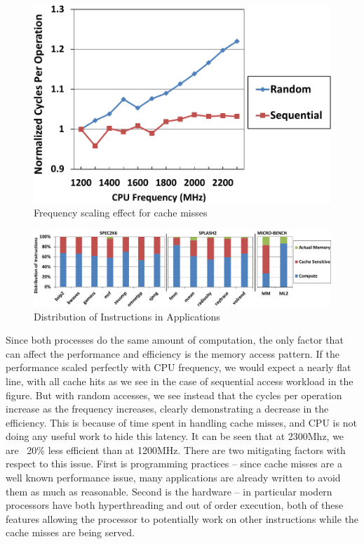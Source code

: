 \begin{figure}
  \begin{center}
\includegraphics[width=\linewidth]{figs/case-crop.pdf}
  \end{center}
  \vspace{-0.1in}
  \caption{Frequency scaling effect for cache misses}
	\label{fig:case}
\end{figure}

\begin{figure}[h]
  \begin{center}
\includegraphics[width=\linewidth]{figs/app-cat-crop.pdf}
  \end{center}
  \vspace{-0.1in}
  \caption{Distribution of Instructions in Applications}
  \label{fig:app-cat}
\end{figure}



Since both processes do the same amount of computation, the only factor that can affect the performance and efficiency is the memory access pattern. 
If the performance scaled perfectly with CPU frequency, we would expect a nearly flat line, with all cache hits
as we see in the case of sequential access workload in the figure. 
But with random accesses, we see instead that the cycles per operation increase as the frequency increases, 
clearly demonstrating a decrease in the efficiency. This is because of time spent in handling cache misses, and 
CPU is not doing any useful work to hide this latency.
It can be seen that at 2300Mhz, we are ~20\% less efficient than at 1200MHz.
There are two mitigating factors with respect to this issue. First is programming practices -- since cache misses are a well known performance issue, 
many applications are already written to avoid them as much as reasonable. Second is the hardware -- in particular modern processors have both hyperthreading and out of order execution, 
both of these features allowing the processor to potentially work on other instructions while the cache misses
are being served. 

